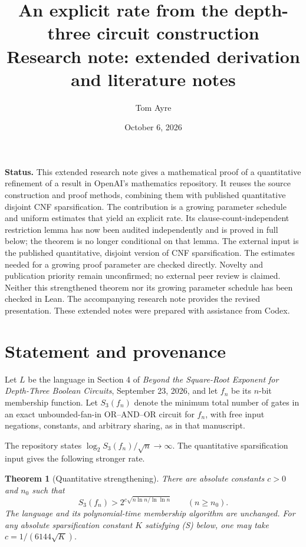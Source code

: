 \documentclass[11pt]{article}
\title{An explicit rate from the depth-three circuit construction\\[0.5em]
\large Research note: extended derivation and literature notes}
\author{Tom Ayre}
\date{October 6, 2026}
\newtheorem{theorem}{Theorem}
\begin{document}
\maketitle

\noindent\textbf{Status.}
This extended research note gives a mathematical proof of a quantitative
refinement of a result in OpenAI's mathematics repository. It reuses the
source construction and proof methods, combining them with published
quantitative disjoint CNF sparsification. The contribution is a growing
parameter schedule and uniform estimates that yield an explicit rate.
Its clause-count-independent
restriction lemma has now been audited independently and is proved in full
below; the theorem is no longer conditional on that lemma. The external
input is the published quantitative, disjoint version of CNF sparsification.
The estimates needed for a growing proof parameter are checked directly.
Novelty and publication priority remain unconfirmed; no external peer review
is claimed. Neither this strengthened theorem nor its growing parameter
schedule has been checked in Lean. The accompanying research note provides
the revised presentation. These extended notes were prepared with assistance
from Codex.

\section{Statement and provenance}

Let $L$ be the language in Section 4 of
\emph{Beyond the Square-Root Exponent for Depth-Three Boolean Circuits},
September 23, 2026, and let $f_n$ be its $n$-bit membership function.
Let $S_3(f_n)$ denote the minimum total number of gates in an exact
unbounded-fan-in OR--AND--OR circuit for $f_n$, with free input negations,
constants, and arbitrary sharing, as in that manuscript.

The repository states $\log_2 S_3(f_n)/\sqrt n\to\infty$.
The quantitative sparsification input gives the following stronger rate.

\begin{theorem}[Quantitative strengthening]
There are absolute constants $c>0$ and $n_0$ such that
\[
 S_3(f_n)>2^{c\sqrt{n\ln n/\ln\ln n}}
 \qquad(n\ge n_0).
\]
The language and its polynomial-time membership algorithm are unchanged.
For any absolute sparsification constant $K$ satisfying (S) below, one may take
$c=1/(6144\sqrt K)$.
\end{theorem}
\end{document}
